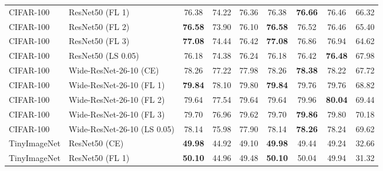 \begin{table}[h!]
{\begin{tabular}{llccccccc}
   CIFAR-100 &             ResNet50 (FL 1) &                  76.38 &                  74.22 &                  76.36 &                  76.38 & \textbf{76.66} &                  76.46 &                  66.32 \\
   CIFAR-100 &             ResNet50 (FL 2) & \textbf{76.58} &                  73.90 &                  76.10 & \textbf{76.58} &                  76.52 &                  76.46 &                  65.40 \\
   CIFAR-100 &             ResNet50 (FL 3) & \textbf{77.08} &                  74.44 &                  76.42 & \textbf{77.08} &                  76.86 &                  76.94 &                  64.62 \\
   CIFAR-100 &          ResNet50 (LS 0.05) &                  76.18 &                  74.38 &                  76.24 &                  76.18 &                  76.42 & \textbf{76.48} &                  67.98 \\
   CIFAR-100 &      Wide-ResNet-26-10 (CE) &                  78.26 &                  77.22 &                  77.98 &                  78.26 & \textbf{78.38} &                  78.22 &                  67.72 \\
   CIFAR-100 &    Wide-ResNet-26-10 (FL 1) & \textbf{79.84} &                  78.10 &                  79.80 & \textbf{79.84} &                  79.76 &                  79.76 &                  68.82 \\
   CIFAR-100 &    Wide-ResNet-26-10 (FL 2) &                  79.64 &                  77.54 &                  79.64 &                  79.64 &                  79.96 & \textbf{80.04} &                  69.44 \\
   CIFAR-100 &    Wide-ResNet-26-10 (FL 3) &                  79.70 &                  76.96 &                  79.62 &                  79.70 & \textbf{79.86} &                  79.80 &                  70.18 \\
   CIFAR-100 & Wide-ResNet-26-10 (LS 0.05) &                  78.14 &                  75.98 &                  77.90 &                  78.14 & \textbf{78.26} &                  78.24 &                  69.62 \\
TinyImageNet &               ResNet50 (CE) & \textbf{49.98} &                  44.92 &                  49.10 & \textbf{49.98} &                  49.44 &                  49.24 &                  32.66 \\
TinyImageNet &             ResNet50 (FL 1) & \textbf{50.10} &                  44.96 &                  49.48 & \textbf{50.10} &                  50.04 &                  49.94 &                  31.32 \\

\end{tabular}}
\end{table}
